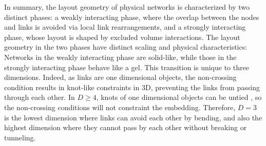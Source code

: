 \documentclass[endfloats,nofootinbib,preprint,floatfix,titlepage,superscriptaddress,linenumbers]{revtex4-1} %
\begin{document}
In summary, the layout geometry of physical networks is characterized by two distinct phases: a weakly interacting phase, where the overlap between the nodes and links is avoided via local link rearrangements, and a strongly interacting phase, whose layout is shaped by %
excluded volume interactions. 
The layout geometry in the two phases have distinct scaling and physical characteristics: Networks in the weakly interacting phase are solid-like, while
those in the strongly interacting phase behave like a gel. 
This transition is unique to three dimensions. 
Indeed, as links are one dimensional objects, the non-crossing condition results in knot-like constraints in 3D, preventing the links from passing through each other.
In $D\geq 4$, knots of one dimensional objects can be untied \cite{zeeman1963unknotting}, so the non-crossing conditions will not constraint the embedding. 
Therefore, %
$D=3$ is the lowest dimension  where links can avoid each other by bending, and also the highest dimension where they cannot pass by each other without breaking or tunneling.  

\end{document}
